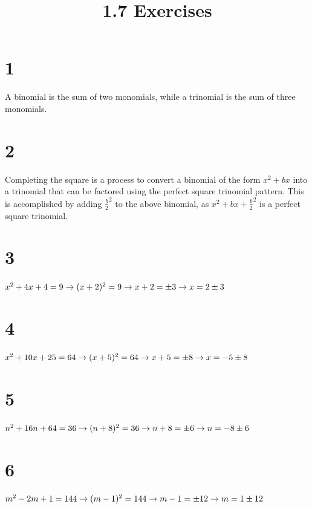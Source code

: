 \documentclass{article}
\title{1.7 Exercises}
\theoremstyle{definition}
\begin{document}
\maketitle

\section*{1}
A binomial is the sum of two monomials, while a trinomial is the sum of three monomials.

\section*{2}
Completing the square is a process to convert a binomial of the form $x^2+bx$ into a trinomial that can be factored using the perfect square trinomial 
pattern. This is accomplished by adding $\frac{b}{2}^2$ to the above binomial, as $x^2+bx+\frac{b}{2}^2$ is a perfect square trinomial.

\section*{3}
$x^2+4x+4=9\newline\rightarrow (x+2)^2=9\newline\rightarrow x+2=\pm 3\newline\rightarrow x=2\pm 3$

\section*{4}
$x^2+10x+25=64\newline\rightarrow (x+5)^2=64\newline\rightarrow x+5=\pm 8\newline\rightarrow x=-5\pm 8$

\section*{5}
$n^2+16n+64=36\newline\rightarrow (n+8)^2=36\newline\rightarrow n+8=\pm 6\newline\rightarrow n=-8\pm 6$

\section*{6}
$m^2-2m+1=144\newline\rightarrow (m-1)^2=144\newline\rightarrow m-1=\pm 12\newline\rightarrow m=1\pm 12$
\end{document}
